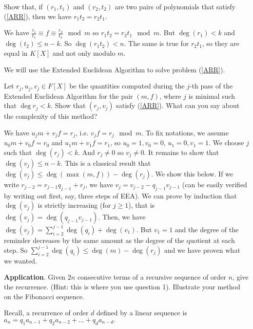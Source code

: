 \documentclass[11pt]{exam}
\theoremstyle{definition}
\begin{document}
{\begin{questions}
	\question Show that, if $(r_1,t_1)$ and $(r_2,t_2)$ are two pairs of polynomials that satisfy (\ref{ARR}), then we have $r_1t_2=r_2t_1$.
	
	\begin{solution}
		We have $\frac{r_1}{t_1} \equiv f \equiv \frac{r_2}{t_2} \mod m$ so $r_1t_2=r_2t_1 \mod m$. But $\deg(r_1) < k$ and $\deg(t_2) \leq n-k$. So $\deg(r_1t_2) < n$. The same is true for $r_2t_1$, so they are equal in $K[X]$ and not only modulo $m$.
	\end{solution}
	
	
	We will use the Extended Euclidean Algorithm to solve problem (\ref{ARR}).
	
	
	\question Let $r_j,u_j,v_j\in F[X]$ be the quantities computed during the $j$-th pass of the Extended Euclidean Algorithm for the pair $(m,f)$, where $j$ is minimal such that $\deg r_j <k$. Show that $(r_j, v_j)$ satisfy (\ref{ARR}). What can you say about the complexity of this method?
	
	\begin{solution}
		We have $u_j m + v_j f = r_j$, i.e. $v_j f = r_j \mod m$.
		To fix notations, we assume $u_0m+v_0f =r_0$ and $u_1m+v_1f = r_1$, so $u_0=1, v_0 = 0$, $u_1=0, v_1 = 1$.
		 We choose $j$ such that $\deg(r_j) < k$. And $r_j \neq 0$ so $v_j \neq 0$. It remains to show that $\deg(v_j) \leq n-k$. This is a classical result that $\deg(v_j) \leq \deg(\max(m,f)) - \deg(r_j)$. We show this below. If we write $r_{j-2} = r_{j-1}q_{j-1} + r_j$, we have $v_j = v_{j-2} - q_{j-1}v_{j-1}$ (can be easily verified by writing out first, say, three steps of EEA). We can prove by induction that $\deg(v_j)$ is strictly increasing (for $j \geq 1$), that is $\deg(v_j) = \deg(q_{j-1}v_{j-1})$. Then, we have $\deg(v_j) = \sum_{i = 2}^{j-1} \deg(q_i) + \deg(v_1)$. But $v_1 = 1$ and the degree of the reminder decreases by the same amount as the degree of the quotient at each step. So $\sum_{i = 2}^{j-1} \deg(q_i) \leq \deg(m) - \deg(r_j)$ and we have proven what we wanted.
	\end{solution}
	
	
	\question \textbf{Application}. Given $2n$ consecutive terms of a recursive sequence of order $n$, give the recurrence. (Hint: this is where you use question 1). Illustrate your method on the Fibonacci sequence.
	
	\begin{solution}
		Recall, a recurrence of order $d$ defined by a linear sequence is $a_n = q_1 a_{n-1}+q_2 a_{n-2} + \ldots + q_d a_{n-d}.$
		

\end{solution}
\end{questions}}
\end{document}
